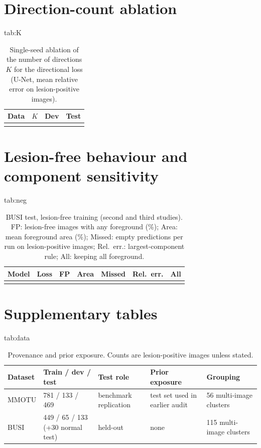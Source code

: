 \documentclass{midl}
\begin{document}
\section{Direction-count ablation}\label{app:K}
\begin{table}[htbp]
\floatconts
  {tab:K}
  {\caption{Single-seed ablation of the number of directions $K$ for the directional loss (U-Net, mean relative error on lesion-positive images).}}
  {\small\begin{tabular}{llll}
  \toprule
  Data & $K$ & Dev & Test\\
  \midrule
  \relax
  \bottomrule
  \end{tabular}}
\end{table}

\section{Lesion-free behaviour and component sensitivity}\label{app:neg}
\begin{table}[htbp]
\floatconts
  {tab:neg}
  {\caption{BUSI test, lesion-free training (second and third studies). FP: lesion-free images with any foreground (\%); Area: mean foreground area (\%); Missed: empty predictions per run on lesion-positive images; Rel.\ err.: largest-component rule; All: keeping all foreground.}}
  {\small\begin{tabular}{lllllll}
  \toprule
  Model & Loss & FP & Area & Missed & Rel.\ err. & All\\
  \midrule
  \relax
  \bottomrule
  \end{tabular}}
\end{table}

\section{Supplementary tables}\label{app:sup}
\begin{table}[htbp]
\floatconts
  {tab:data}
  {\caption{Provenance and prior exposure. Counts are lesion-positive images unless stated.}}
  {\small\begin{tabular}{lllll}
  \toprule
  Dataset & Train / dev / test & Test role & Prior exposure & Grouping\\
  \midrule
  MMOTU & 781 / 133 / 469 & benchmark replication & test set used in earlier audit & 56 multi-image clusters\\
  BUSI & 449 / 65 / 133 (+30 normal test) & held-out & none & 115 multi-image clusters\\
  \bottomrule
  \end{tabular}}
\end{table}
\end{document}
